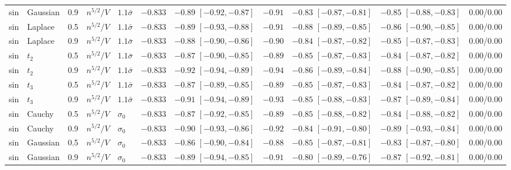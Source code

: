 \begin{longtable}{lllllcccccc}
sin & Gaussian & 0.9 & $n^{5/2}/V$ & $1.1\bar\sigma$ & $-0.833$ & $-0.89$ {\scriptsize $[-0.92, -0.87]$} & $-0.91$ & $-0.83$ {\scriptsize $[-0.87, -0.81]$} & $-0.85$ {\scriptsize $[-0.88, -0.83]$} & 0.00/0.00 \\
sin & Laplace & 0.5 & $n^{5/2}/V$ & $1.1\bar\sigma$ & $-0.833$ & $-0.89$ {\scriptsize $[-0.93, -0.88]$} & $-0.91$ & $-0.88$ {\scriptsize $[-0.89, -0.85]$} & $-0.86$ {\scriptsize $[-0.90, -0.85]$} & 0.00/0.00 \\
sin & Laplace & 0.9 & $n^{5/2}/V$ & $1.1\bar\sigma$ & $-0.833$ & $-0.88$ {\scriptsize $[-0.90, -0.86]$} & $-0.90$ & $-0.84$ {\scriptsize $[-0.87, -0.82]$} & $-0.85$ {\scriptsize $[-0.87, -0.83]$} & 0.00/0.00 \\
sin & $t_2$ & 0.5 & $n^{5/2}/V$ & $1.1\bar\sigma$ & $-0.833$ & $-0.87$ {\scriptsize $[-0.90, -0.85]$} & $-0.89$ & $-0.85$ {\scriptsize $[-0.87, -0.83]$} & $-0.84$ {\scriptsize $[-0.87, -0.82]$} & 0.00/0.00 \\
sin & $t_2$ & 0.9 & $n^{5/2}/V$ & $1.1\bar\sigma$ & $-0.833$ & $-0.92$ {\scriptsize $[-0.94, -0.89]$} & $-0.94$ & $-0.86$ {\scriptsize $[-0.89, -0.84]$} & $-0.88$ {\scriptsize $[-0.90, -0.85]$} & 0.00/0.00 \\
sin & $t_3$ & 0.5 & $n^{5/2}/V$ & $1.1\bar\sigma$ & $-0.833$ & $-0.87$ {\scriptsize $[-0.89, -0.85]$} & $-0.89$ & $-0.85$ {\scriptsize $[-0.87, -0.83]$} & $-0.84$ {\scriptsize $[-0.87, -0.82]$} & 0.00/0.00 \\
sin & $t_3$ & 0.9 & $n^{5/2}/V$ & $1.1\bar\sigma$ & $-0.833$ & $-0.91$ {\scriptsize $[-0.94, -0.89]$} & $-0.93$ & $-0.85$ {\scriptsize $[-0.88, -0.83]$} & $-0.87$ {\scriptsize $[-0.89, -0.84]$} & 0.00/0.00 \\
sin & Cauchy & 0.5 & $n^{5/2}/V$ & $\sigma_0$ & $-0.833$ & $-0.87$ {\scriptsize $[-0.92, -0.85]$} & $-0.89$ & $-0.85$ {\scriptsize $[-0.88, -0.82]$} & $-0.84$ {\scriptsize $[-0.88, -0.82]$} & 0.00/0.00 \\
sin & Cauchy & 0.9 & $n^{5/2}/V$ & $\sigma_0$ & $-0.833$ & $-0.90$ {\scriptsize $[-0.93, -0.86]$} & $-0.92$ & $-0.84$ {\scriptsize $[-0.91, -0.80]$} & $-0.89$ {\scriptsize $[-0.93, -0.84]$} & 0.00/0.00 \\
sin & Gaussian & 0.5 & $n^{5/2}/V$ & $\sigma_0$ & $-0.833$ & $-0.86$ {\scriptsize $[-0.90, -0.84]$} & $-0.88$ & $-0.85$ {\scriptsize $[-0.87, -0.81]$} & $-0.83$ {\scriptsize $[-0.87, -0.80]$} & 0.00/0.00 \\
sin & Gaussian & 0.9 & $n^{5/2}/V$ & $\sigma_0$ & $-0.833$ & $-0.89$ {\scriptsize $[-0.94, -0.85]$} & $-0.91$ & $-0.80$ {\scriptsize $[-0.89, -0.76]$} & $-0.87$ {\scriptsize $[-0.92, -0.81]$} & 0.00/0.00 \\

\end{longtable}
